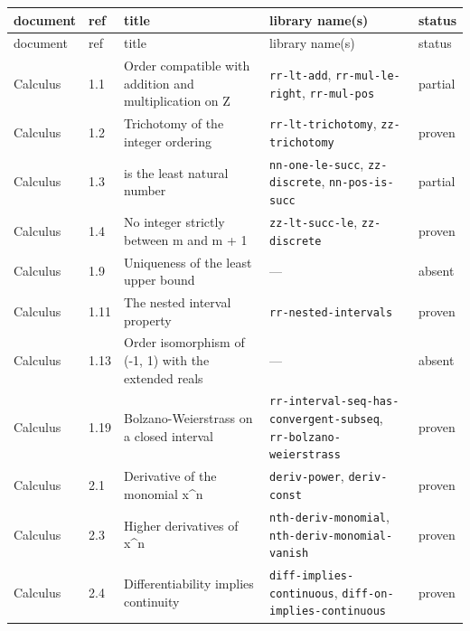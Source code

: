 \begin{longtable}{@{}ll>{\raggedright\arraybackslash}p{4.2cm}>{\raggedright\arraybackslash}p{4.2cm}l@{}}
\hline
document & ref & title & library name(s) & status \\
\hline
\endfirsthead
\hline
document & ref & title & library name(s) & status \\
\hline
\endhead
Calculus & 1.1 & Order compatible with addition and multiplication on Z & \texttt{rr-\allowbreak{}lt-\allowbreak{}add}, \texttt{rr-\allowbreak{}mul-\allowbreak{}le-\allowbreak{}right}, \texttt{rr-\allowbreak{}mul-\allowbreak{}pos} & partial \\
Calculus & 1.2 & Trichotomy of the integer ordering & \texttt{rr-\allowbreak{}lt-\allowbreak{}trichotomy}, \texttt{zz-\allowbreak{}trichotomy} & proven \\
Calculus & 1.3 & 1 is the least natural number & \texttt{nn-\allowbreak{}one-\allowbreak{}le-\allowbreak{}succ}, \texttt{zz-\allowbreak{}discrete}, \texttt{nn-\allowbreak{}pos-\allowbreak{}is-\allowbreak{}succ} & partial \\
Calculus & 1.4 & No integer strictly between m and m + 1 & \texttt{zz-\allowbreak{}lt-\allowbreak{}succ-\allowbreak{}le}, \texttt{zz-\allowbreak{}discrete} & proven \\
Calculus & 1.9 & Uniqueness of the least upper bound & --- & absent \\
Calculus & 1.11 & The nested interval property & \texttt{rr-\allowbreak{}nested-\allowbreak{}intervals} & proven \\
Calculus & 1.13 & Order isomorphism of (-1, 1) with the extended reals & --- & absent \\
Calculus & 1.19 & Bolzano-Weierstrass on a closed interval & \texttt{rr-\allowbreak{}interval-\allowbreak{}seq-\allowbreak{}has-\allowbreak{}convergent-\allowbreak{}subseq}, \texttt{rr-\allowbreak{}bolzano-\allowbreak{}weierstrass} & proven \\
Calculus & 2.1 & Derivative of the monomial x\textasciicircum{}n & \texttt{deriv-\allowbreak{}power}, \texttt{deriv-\allowbreak{}const} & proven \\
Calculus & 2.3 & Higher derivatives of x\textasciicircum{}n & \texttt{nth-\allowbreak{}deriv-\allowbreak{}monomial}, \texttt{nth-\allowbreak{}deriv-\allowbreak{}monomial-\allowbreak{}vanish} & proven \\
Calculus & 2.4 & Differentiability implies continuity & \texttt{diff-\allowbreak{}implies-\allowbreak{}continuous}, \texttt{diff-\allowbreak{}on-\allowbreak{}implies-\allowbreak{}continuous} & proven \\

\end{longtable}
